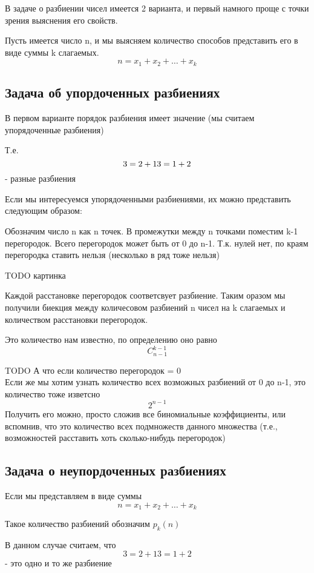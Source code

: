 В задаче о разбиении чисел имеется 2 варианта, и первый намного проще с точки зрения выяснения его свойств.

Пусть имеется число n, и мы выясняем количество способов представить его в виде суммы k слагаемых.
$$
n = x_1 + x_2 + \ldots + x_k
$$

\subsection{Задача об упордоченных разбиениях}

В первом варианте порядок разбиения имеет значение (мы считаем упорядоченные разбиения)

Т.е.
$$
3 = 2+1 \\
3 = 1+2
$$
- разные разбиения

Если мы интересуемся упорядоченными разбиениями, их можно представить следующим образом:

Обозначим число n как n точек. В промежутки между n точками поместим k-1 перегородок.
Всего перегородок может быть от 0 до n-1.
Т.к. нулей нет, по краям перегородка ставить нельзя (несколько в ряд тоже нельзя)

TODO картинка

Каждой расстановке перегородок соответсвует разбиение.
Таким оразом мы получили биекция между количесовом разбиений n чисел на k слагаемых и количеством расстановки перегородок.

Это количество нам известно, по определению оно равно 
$$
C_{n-1}^{k-1}
$$

TODO А что если количество перегородок = 0 \\

Если же мы хотим узнать количество всех возможных разбиений от 0 до n-1, это количество тоже изветсно
$$
2^{n-1}
$$
Получить его можно, просто сложив все биномиальные коэффициенты, или вспомнив, что это количество всех подмножеств данного множества (т.е., возможностей расставить хоть сколько-нибудь перегородок)

\subsection{Задача о неупордоченных разбиениях}

Если мы представляем в виде суммы 
$$
n = x_1 + x_2 + \ldots + x_k
$$

Такое количество разбиений обозначим $p_k(n)$

В данном случае считаем, что
$$
3 = 2+1
3 = 1+2
$$
- это одно и то же разбиение

